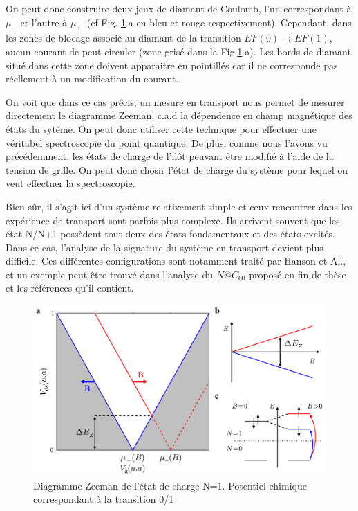 On peut donc construire deux jeux de diamant de Coulomb, l'un correspondant à $\mu_{-}$ et l'autre à $\mu_{+}$~(cf Fig. \ref{charge_discharge}.a en bleu et rouge respectivement). Cependant, dans les zones de blocage associé au diamant de la transition $EF(0)\rightarrow EF(1)$, aucun courant de peut circuler (zone grisé dans la Fig.\ref{charge_discharge}.a). Les bords de diamant situé dans cette zone doivent apparaitre en pointillés car il ne corresponde pas réellement à un modification du courant.

On voit que dans ce cas précis, un mesure en transport nous permet de mesurer directement le diagramme Zeeman, c.a.d la dépendence en champ magnétique des états du sytème. On peut donc utiliser cette technique pour effectuer une véritabel spectroscopie du point quantique. De plus, comme nous l'avons vu précédemment, les états de charge de l'il\^ot peuvant \^etre modifié à l'aide de la tension de grille. On peut donc chosir l'état de charge du système pour lequel on veut effectuer la spectroscopie.

 Bien s\^ur, il s'agit ici d'un système relativement simple et ceux rencontrer dans les expérience de transport sont parfois plus complexe. Ils arrivent souvent que les état N/N+1 possèdent tout deux des états fondamentaux et des états excités. Dans ce cas, l'analyse de la signature du système en transport devient plus difficile. Ces différentes configurations sont notamment traité par Hanson et Al., et un exemple peut \^etre trouvé dans l'analyse du $N@C_{60}$ proposé en fin de thèse et les références qu'il contient.

\begin{figure}
\includegraphics[scale=0.5]{Theorie/Transport/figure4/figure4.pdf} 
\caption{Diagramme Zeeman de l'état de charge N=1. Potentiel chimique correspondant à la transition 0/1}
\label{charge_discharge}
\end{figure}

